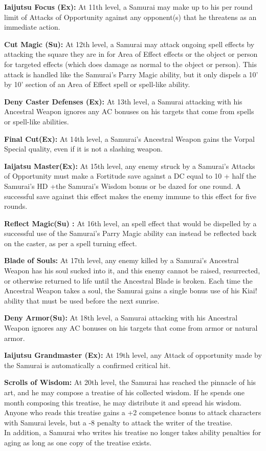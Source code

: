 \documentclass[10pt]{article}
\newcommand{\ability}[2]{\smallskip \noindent \textbf{#1} #2}
\begin{document}
\ability{Iaijutsu Focus (Ex):}{At 11th level, a Samurai may make up to his per round limit of Attacks of Opportunity against any opponent(s) that he threatens as an immediate action.}

\ability{Cut Magic (Su):}{At 12th level, a Samurai may attack ongoing spell effects by attacking the square they are in for Area of Effect effects or the object or person for targeted effects (which does damage as normal to the object or person). This attack is handled like the Samurai's Parry Magic ability, but it only dispels a 10' by 10' section of an Area of Effect spell or spell-like ability.}

\ability{Deny Caster Defenses (Ex):}{At 13th level, a Samurai attacking with his Ancestral Weapon ignores any AC bonuses on his targets that come from spells or spell-like abilities.}

\ability{Final Cut(Ex):}{At 14th level, a Samurai's Ancestral Weapon gains the Vorpal Special quality, even if it is not a slashing weapon.}

\ability{Iaijatsu Master(Ex):}{At 15th level, any enemy struck by a Samurai's Attacks of Opportunity must make a Fortitude save against a DC equal to 10 + half the Samurai's HD +the Samurai's Wisdom bonus or be dazed for one round. A successful save against this effect makes the enemy immune to this effect for five rounds.}

\ability{Reflect Magic(Su) :}{At 16th level, an spell effect that would be dispelled by a successful use of the Samurai's Parry Magic ability can instead be reflected back on the caster, as per a spell turning effect.}

\ability{Blade of Souls:}{At 17th level, any enemy killed by a Samurai's Ancestral Weapon has his soul sucked into it, and this enemy cannot be raised, resurrected, or otherwise returned to life until the Ancestral Blade is broken. Each time the Ancestral Weapon takes a soul, the Samurai gains a single bonus use of his Kiai! ability that must be used before the next sunrise.}

\ability{Deny Armor(Su):}{At 18th level, a Samurai attacking with his Ancestral Weapon ignores any AC bonuses on his targets that come from armor or natural armor.}

\ability{Iaijutsu Grandmaster (Ex):}{At 19th level, any Attack of opportunity made by the Samurai is automatically a confirmed critical hit.}

\ability{Scrolls of Wisdom:}{At 20th level, the Samurai has reached the pinnacle of his art, and he may compose a treatise of his collected wisdom. If he spends one month composing this treatise, he may distribute it and spread his wisdom. Anyone who reads this treatise gains a +2 competence bonus to attack characters with Samurai levels, but a -8 penalty to attack the writer of the treatise.\\

In addition, a Samurai who writes his treatise no longer takes ability penalties for aging as long as one copy of the treatise exists.}
\end{document}
